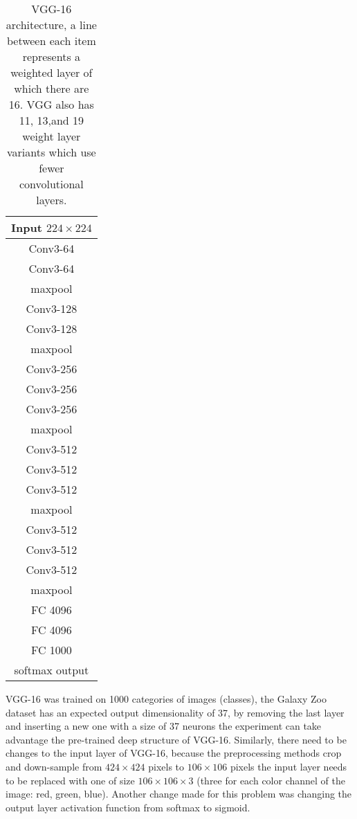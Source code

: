 \begin{table}
    \begin{center}
        \begin{tabular}{| c |}
        \hline
        Input $224 \times 224$ \\
        \hline
        Conv3-64 \\
        Conv3-64 \\
        \hline
        maxpool\\
        \hline
        Conv3-128 \\
        Conv3-128 \\
        \hline
        maxpool \\
        \hline
        Conv3-256 \\
        Conv3-256 \\
        Conv3-256 \\
        \hline
        maxpool \\
        \hline
        Conv3-512 \\
        Conv3-512 \\
        Conv3-512 \\
        \hline
        maxpool \\
        \hline
        Conv3-512 \\
        Conv3-512 \\
        Conv3-512 \\
        \hline
        maxpool\\
        \hline
        FC 4096\\
        \hline
        FC 4096\\
        \hline
        FC 1000\\
        \hline
        softmax output\\
        \hline
        \end{tabular}
        \caption{VGG-16 architecture, a line between each item represents a weighted layer of which there are 16. VGG also has 11, 13,and 19 weight layer variants which use fewer convolutional layers.}
    \end{center}
\end{table}


VGG-16 was trained on 1000 categories of images (classes), the Galaxy Zoo dataset has an expected output dimensionality of 37, by removing the last layer and inserting a new one with a size of 37 neurons the experiment can take advantage the pre-trained deep structure of VGG-16. Similarly, there need to be changes to the input layer of VGG-16, because the preprocessing methods crop and down-sample from $424 \times 424$ pixels to $106 \times 106$ pixels the input layer needs to be replaced with one of size $106 \times 106 \times 3$ (three for each color channel of the image: red, green, blue). Another change made for this problem was changing the output layer activation function from softmax to sigmoid.

